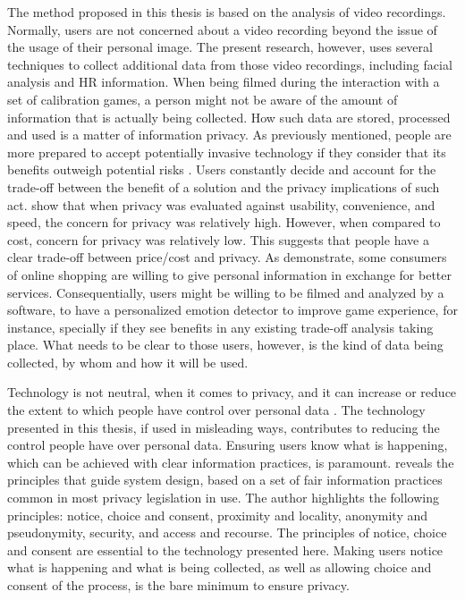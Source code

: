 The method proposed in this thesis is based on the analysis of video recordings. Normally, users are not concerned about a video recording beyond the issue of the usage of their personal image. The present research, however, uses several techniques to collect additional data from those video recordings, including facial analysis and HR information. When being filmed during the interaction with a set of calibration games, a person might not be aware of the amount of information that is actually being collected. How such data are stored, processed and used is a matter of information privacy. As previously mentioned, people are more prepared to accept potentially invasive technology if they consider that its benefits outweigh potential risks \parencite{ladd1991computers}. Users constantly decide and account for the trade-off between the benefit of a solution and the privacy implications of such act. \textcite{nguyen2016effects} show that when privacy was evaluated against usability, convenience, and speed, the concern for privacy was relatively high. However, when compared to cost, concern for privacy was relatively low. This suggests that people have a clear trade-off between price/cost and privacy. As \textcite{awad2006personalization} demonstrate, some consumers of online shopping are willing to give personal information in exchange for better services. Consequentially, users might be willing to be filmed and analyzed by a software, to have a personalized emotion detector to improve game experience, for instance, specially if they see benefits in any existing trade-off analysis taking place. What needs to be clear to those users, however, is the kind of data being collected, by whom and how it will be used.

Technology is not neutral, when it comes to privacy, and it can increase or reduce the extent to which people have control over personal data \parencite{bellotti1993design}. The technology presented in this thesis, if used in misleading ways, contributes to reducing the control people have over personal data. Ensuring users know what is happening, which can be achieved with clear information practices, is paramount. \textcite{langheinrich2001privacy} reveals the principles that guide system design, based on a set of fair information practices common in most privacy legislation in use. The author highlights the following principles: notice, choice and consent, proximity and locality, anonymity and pseudonymity, security, and access and recourse. The principles of notice, choice and consent are essential to the technology presented here. Making users notice what is happening and what is being collected, as well as allowing choice and consent of the process, is the bare minimum to ensure privacy.

